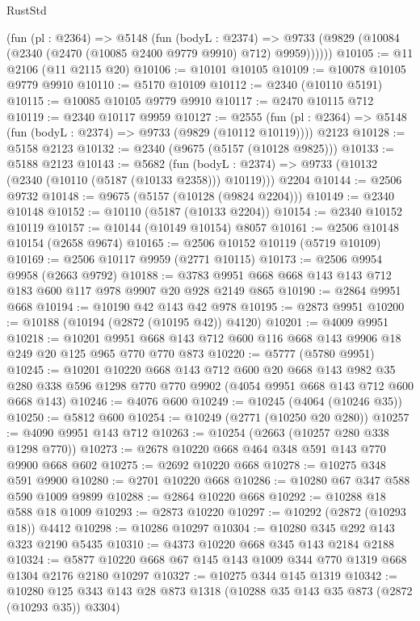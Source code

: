 \begin{lexlean}{RustStd}
\begin{coremodule}
      (fun (pl : @2364) =>
      @5148
        (fun (bodyL : @2374) =>
        @9733 (@9829 (@10084 (@2340 (@2470 (@10085 @2400 @9779 @9910) @712) @9959))))))
@10105 := @11 @2106 (@11 @2115 @20)
@10106 := @10101 @10105
@10109 := @10078 @10105 @9779 @9910
@10110 := @5170 @10109
@10112 := @2340 (@10110 @5191)
@10115 := @10085 @10105 @9779 @9910
@10117 := @2470 @10115 @712
@10119 := @2340 @10117 @9959
@10127 := @2555
    (fun (pl : @2364) => @5148 (fun (bodyL : @2374) => @9733 (@9829 (@10112 @10119))))
    @2123
@10128 := @5158 @2123
@10132 := @2340 (@9675 (@5157 (@10128 @9825)))
@10133 := @5188 @2123
@10143 := @5682
    (fun (bodyL : @2374) => @9733 (@10132 (@2340 (@10110 (@5187 (@10133 @2358))) @10119)))
    @2204
@10144 := @2506 @9732
@10148 := @9675 (@5157 (@10128 (@9824 @2204)))
@10149 := @2340 @10148
@10152 := @10110 (@5187 (@10133 @2204))
@10154 := @2340 @10152 @10119
@10157 := @10144 (@10149 @10154) @8057
@10161 := @2506 @10148 @10154 (@2658 @9674)
@10165 := @2506 @10152 @10119 (@5719 @10109)
@10169 := @2506 @10117 @9959 (@2771 @10115)
@10173 := @2506 @9954 @9958 (@2663 @9792)
@10188 := @3783 @9951 @668 @668 @143 @143 @712 @183 @600 @117 @978 @9907 @20 @928 @2149 @865
@10190 := @2864 @9951 @668
@10194 := @10190 @42 @143 @42 @978
@10195 := @2873 @9951
@10200 := @10188 (@10194 (@2872 (@10195 @42)) @4120)
@10201 := @4009 @9951
@10218 := @10201
    @9951
    @668
    @143
    @712
    @600
    @116
    @668
    @143
    @9906
    @18
    @249
    @20
    @125
    @965
    @770
    @770
    @873
@10220 := @5777 (@5780 @9951)
@10245 := @10201
    @10220
    @668
    @143
    @712
    @600
    @20
    @668
    @143
    @982
    @35
    @280
    @338
    @596
    @1298
    @770
    @770
    @9902
    (@4054 @9951 @668 @143 @712 @600 @668 @143)
@10246 := @4076 @600
@10249 := @10245 (@4064 (@10246 @35))
@10250 := @5812 @600
@10254 := @10249 (@2771 (@10250 @20 @280))
@10257 := @4090 @9951 @143 @712
@10263 := @10254 (@2663 (@10257 @280 @338 @1298 @770))
@10273 := @2678 @10220 @668 @464 @348 @591 @143 @770 @9900 @668 @602
@10275 := @2692 @10220 @668
@10278 := @10275 @348 @591 @9900
@10280 := @2701 @10220 @668
@10286 := @10280 @67 @347 @588 @590 @1009 @9899
@10288 := @2864 @10220 @668
@10292 := @10288 @18 @588 @18 @1009
@10293 := @2873 @10220
@10297 := @10292 (@2872 (@10293 @18)) @4412
@10298 := @10286 @10297
@10304 := @10280 @345 @292 @143 @323 @2190 @5435
@10310 := @4373 @10220 @668 @345 @143 @2184 @2188
@10324 := @5877 @10220 @668 @67 @145 @143 @1009 @344 @770 @1319 @668 @1304 @2176 @2180 @10297
@10327 := @10275 @344 @145 @1319
@10342 := @10280 @125 @343 @143 @28 @873 @1318 (@10288 @35 @143 @35 @873 (@2872 (@10293 @35)) @3304)

\end{coremodule}
\end{lexlean}
